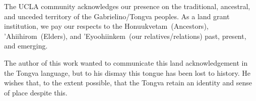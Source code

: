 
\vspace*{\fill}
\begin{center}
    \begin{minipage}{\linewidth}
        The UCLA community acknowledges our presence on the traditional, ancestral, and unceded territory of the Gabrielino/Tongva peoples.
        As a land grant institution, we pay our respects to the Honuukvetam~(Ancestors), 'Ahiihirom~(Elders), and 'Eyoohiinkem~(our relatives/relations) past, present, and emerging.

        \vspace{1cm}

        The author of this work wanted to communicate this land acknowledgement in the Tongva language, but to his dismay this tongue has been lost to history.
        He wishes that, to the extent possible, that the Tongva retain an identity and sense of place despite this.
    \end{minipage}
\end{center}
\vspace*{\fill}
